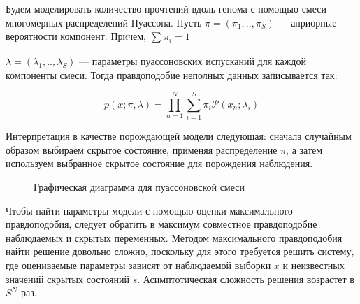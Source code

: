 \documentclass{matmex-diploma-custom}
\begin{document}

Будем моделировать количество прочтений вдоль генома с помощью смеси многомерных распределений Пуассона. Пусть $\pi = (\pi_1,..,\pi_S)$ --- априорные вероятности компонент. Причем, $\sum_{}\pi_i = 1$

$\lambda = (\lambda_1,..,\lambda_S)$ --- параметры пуассоновских испусканий для каждой компоненты смеси. Тогда правдоподобие неполных данных записывается так:

\begin{equation}
p(x;\pi,\lambda) = \prod_{n=1}^N\sum_{i=1}^S\pi_i\mathcal{P}(x_n;\lambda_i)
\end{equation}

Интерпретация в качестве порождающей модели следующая\cite{book:flach}: сначала случайным образом выбираем скрытое состояние, применяя распределение $\pi$, а затем используем выбранное скрытое состояние для порождения наблюдения.

\begin{figure}[h!]
  \centering
  \caption{Графическая диаграмма для пуассоновской смеси}
  \label{fig:generative-mm}
\end{figure}

Чтобы найти параметры модели с помощью оценки максимального правдоподобия, следует обратить в максимум совместное правдоподобие наблюдаемых и скрытых переменных. Методом максимального правдоподобия найти решение довольно сложно, поскольку для этого требуется решить систему, где оцениваемые параметры зависят от наблюдаемой выборки $x$ и неизвестных значений скрытых состояний $s$. Асимптотическая сложность решения возрастет в $S^N$ раз.
\end{document}
